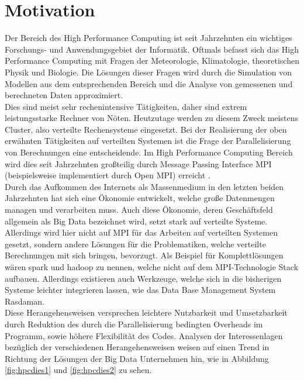 \documentclass[
	12pt,
	a4paper,
	BCOR10mm,
	DIV14,
	listof=totoc,
	bibliography=totoc,
	headsepline
]{scrreprt}
\begin{document}
\section{Motivation}
Der Bereich des High Performance Computing ist seit Jahrzehnten ein wichtiges Forschungs- und Anwendungsgebiet der Informatik.
Oftmals befasst sich das High Performance Computing mit Fragen der Meteorologie, Klimatologie, theoretischen Physik und Biologie.
Die Lösungen dieser Fragen wird durch die Simulation von Modellen aus dem entsprechenden Bereich und die Analyse von gemessenen und berechneten Daten approximiert. \\
Dies sind meist sehr rechenintensive Tätigkeiten, daher sind extrem leistungsstarke Rechner von Nöten.
Heutzutage werden zu diesem Zweck meistens Cluster, also verteilte Rechensysteme eingesetzt.
Bei der Realisierung der oben erwähnten Tätigkeiten auf verteilten Systemen ist die Frage der Parallelisierung von Berechnungen eine entscheidende. 
Im High Performance Computing Bereich wird dies seit Jahrzehnten großteilig durch Message Passing Interface MPI (beispielsweise implementiert durch Open MPI) erreicht \cite{HLR}. \\
Durch das Aufkommen des Internets als Massenmedium in den letzten beiden Jahrzehnten hat sich eine Ökonomie entwickelt, welche große Datenmengen managen und verarbeiten muss.
Auch diese Ökonomie, deren Geschäftsfeld allgemein als Big Data bezeichnet wird, setzt stark auf verteilte Systeme.
Allerdings wird hier nicht auf MPI für das Arbeiten auf verteilten Systemen gesetzt, sondern andere Lösungen für die Problematiken, welche verteilte Berechnungen mit sich bringen, bevorzugt.
Als Beispiel für Komplettlösungen wären spark und hadoop zu nennen, welche nicht auf dem MPI-Technologie Stack aufbauen. 
Allerdings existieren auch Werkzeuge, welche sich in die bisherigen Systeme leichter integrieren lassen, wie das Data Base Management System Rasdaman. \\
Diese Herangehensweisen versprechen leichtere Nutzbarkeit und Umsetzbarkeit durch Reduktion des durch die Parallelisierung bedingten Overheads im Programm, sowie höhere Flexibilität des Codes.
Analysen der Interessenlagen bezüglich der verschiedenen Herangehensweisen weisen auf einen Trend in Richtung der Lösungen der Big Data Unternehmen hin, wie in Abbildung \ref{fig:hpcdies1} und \ref{fig:hpcdies2} zu sehen. 
\end{document}
